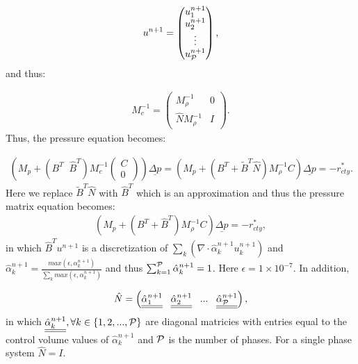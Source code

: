 \begin{eqnarray}
u^{n+1}=
\begin{pmatrix}
u^{n+1}_1 \\ u^{n+1}_2 \\ \vdots \\ u^{n+1}_{\cal P}
\end{pmatrix}  ,
\end{eqnarray}
and thus:

\begin{eqnarray}
M_c^{-1}=
\begin{pmatrix}
M_\rho^{-1}  & 0 \\
\hat N M_\rho^{-1}   & I
\end{pmatrix}  .
\end{eqnarray}
Thus, the pressure equation becomes:

\begin{eqnarray}
\left( M_p + (B^T \;\; \hat B^T) { M}_c^{-1}
\begin{pmatrix}
 C \\ 0
\end{pmatrix}  \right)
\underline{\Delta p}
=
\left( M_p +(B^T+ \tilde B^T \hat N) M_{\rho}^{-1} C \right) \underline{\Delta p}= -{r}_{cty}^*  .
\label{delt-p-classic27-phase}
\end{eqnarray}
Here we replace $\tilde B^T \hat N$ with $\hat B^T$ which is an approximation and thus the
pressure matrix equation becomes:
\begin{eqnarray}
\left( M_p +(B^T+ \hat B^T) M_{\rho}^{-1} C \right) \underline{\Delta p}= -{r}_{cty}^{*} ,
\label{delt-p-classic27-phase}
\end{eqnarray}
in which $\hat B^T u^{n+1}$ is a discretization of $\sum_k ( \nabla\cdot \hat\alpha_k^{n+1} u_k^{n+1} )$
and $\hat\alpha_k^{n+1} =\frac{max( \epsilon, \alpha_k^{n+1}) } {\sum_k max( \epsilon, \alpha_k^{n+1}) }$
and thus $\sum_{k=1}^{\cal P} \hat\alpha_k^{n+1} =1$.
Here $\epsilon=1\times 10^{-7}$. In addition,

\begin{eqnarray}
\hat N = \left( \underline{\underline{\hat\alpha_1^{n+1}}} \;\;\; \underline{\underline{\hat\alpha_2^{n+1}} } \;\;\;... \;\;\;  \underline{\underline{\hat\alpha_{\cal P}^{n+1}} }  \right) ,
\end{eqnarray}
in which $ \underline{\underline{\hat\alpha_k^{n+1}}}, \forall k\in\{1,2,...,{\cal P}\} $
are diagonal matricies with entries equal to the control volume values of   ${\hat\alpha_k^{n+1}} $
and $\cal P$ is the number of phases. For a single phase system $\hat N = I$.







